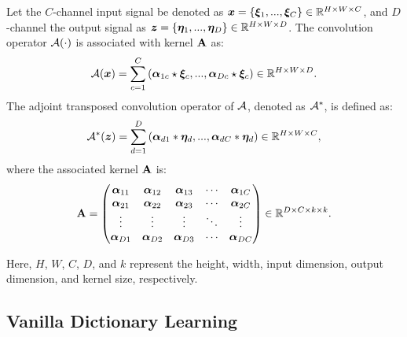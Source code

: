 Let the $C$-channel input signal be denoted as ${\bm{x}}=\left\{{\bm{\xi}}_1,...,{\bm{\xi}}_C\right\}\in\mathbb{R}^{H\times W\times C}$, and $D$-channel
the output signal as ${\bm{z}}=\left\{{\bm{\eta}}_1,...,{\bm{\eta}}_D\right\}\in\mathbb{R}^{H\times W\times D}$. The
convolution operator ${\mathcal{A}}(\cdot)$ is associated with kernel ${\mathbf{A}}$ as:
\begin{equation}
{\mathcal{A}}({\bm{x}}) = \sum_{c=1}^{C}\left({\bm{\alpha}}_{1c}\star{\bm{\xi}}_c,..., {\bm{\alpha}}_{Dc}\star{\bm{\xi}}_c\right) \in \mathbb{R}^{H \times W \times D}.
\label{eq:convolution_layer}
\end{equation}
The adjoint transposed convolution operator of ${\mathcal{A}}$, denoted as ${\mathcal{A}}^*$, is defined as:
\begin{equation}
{\mathcal{A}}^*({\bm{z}}) = \sum_{d=1}^{D}\left({\bm{\alpha}}_{d1}*{\bm{\eta}}_d,..., {\bm{\alpha}}_{dC}*{\bm{\eta}}_d\right) \in \mathbb{R}^{H \times W \times C},
\label{eq:adjoint_convolution_layer}
\end{equation}
where the associated kernel ${\mathbf{A}}$ is:
\begin{equation}
\mathbf{A} = 
\begin{pmatrix}
{\bm{\alpha}}_{11} & {\bm{\alpha}}_{12} & {\bm{\alpha}}_{13} & \cdots & {\bm{\alpha}}_{1C} \\
{\bm{\alpha}}_{21} & {\bm{\alpha}}_{22} & {\bm{\alpha}}_{23} & \cdots & {\bm{\alpha}}_{2C} \\
\vdots & \vdots & \vdots & \ddots & \vdots \\
{\bm{\alpha}}_{D1} & {\bm{\alpha}}_{D2} & {\bm{\alpha}}_{D3} & \cdots & {\bm{\alpha}}_{DC}
\end{pmatrix}
\in \mathbb{R}^{D \times C \times k \times k}.
\label{eq:convolution_kernel}
\end{equation}

Here, $H$, $W$, $C$, $D$, and $k$ represent the height, width, input dimension, output dimension, and kernel size, respectively. 




\subsection{Vanilla Dictionary Learning}


